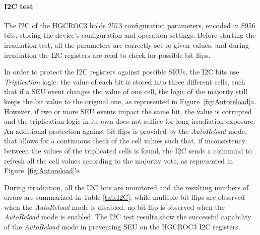 \paragraph{I2C test}

The I2C of the HGCROC3 holds 2573 configuration parameters, encoded in 8956 bits, storing the device's configuration and operation settings. 
Before starting the irradiation test, all the parameters are correctly set to given values, and during irradiation the I2C registers are read to check for possible bit flips.

In order to protect the I2C registers against possible SEUs, the I2C bits use \textit{Triplication} logic: the value of each bit is stored into three different cells, such that if a SEU event changes the value of one cell, the logic of the majority still keeps the bit value to the original one, as represented in Figure~\ref{fig:Autoreload}a. However, if two or more SEU events impact the same bit, the value is corrupted and the triplication logic in its own does not suffice for long irradiation exposure. 
An additional protection against bit flips is provided by the \textit{AutoReload} mode, that allows for a continuous check of the cell values such that, if inconsistency between the values of the triplicated cells is found, the I2C sends a command to refresh all the cell values according to the majority vote, as represented in Figure~\ref{fig:Autoreload}b.

During irradiation, all the I2C bits are monitored and the resulting numbers of errors are summarized in Table \ref{tab:I2C}: while multiple bit flips are observed when the \textit{AutoReload} mode is disabled, no bit flip is observed when the \textit{AutoReload} mode is enabled. The I2C test results show the successful capability of the \textit{AutoReload} mode in preventing SEU on the HGCROC3 I2C registers.


